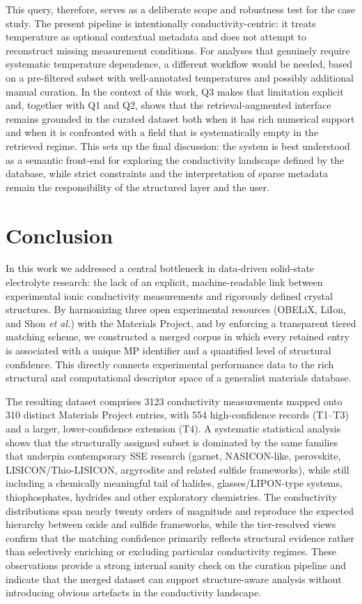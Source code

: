 \documentclass[a4paper,fleqn]{cas-sc}
\begin{document}
This query, therefore, serves as a deliberate scope and robustness test for the case study. The present pipeline is intentionally conductivity-centric: it treats temperature as optional contextual metadata and does not attempt to reconstruct missing measurement conditions. For analyses that genuinely require systematic temperature dependence, a different workflow would be needed, based on a pre-filtered subset with well-annotated temperatures and possibly additional manual curation. In the context of this work, Q3 makes that limitation explicit and, together with Q1 and Q2, shows that the retrieval-augmented interface remains grounded in the curated dataset both when it has rich numerical support and when it is confronted with a field that is systematically empty in the retrieved regime. This sets up the final discussion: the system is best understood as a semantic front-end for exploring the conductivity landscape defined by the database, while strict constraints and the interpretation of sparse metadata remain the responsibility of the structured layer and the user.



\section{Conclusion}

In this work we addressed a central bottleneck in data-driven solid-state electrolyte research: the lack of an explicit, machine-readable link between experimental ionic conductivity measurements and rigorously defined crystal structures. By harmonizing three open experimental resources (OBELiX, LiIon, and Shon \textit{et al.}) with the Materials Project, and by enforcing a transparent tiered matching scheme, we constructed a merged corpus in which every retained entry is associated with a unique MP identifier and a quantified level of structural confidence. This directly connects experimental performance data to the rich structural and computational descriptor space of a generalist materials database.

The resulting dataset comprises 3123 conductivity measurements mapped onto 310 distinct Materials Project entries, with 554 high-confidence records (T1–T3) and a larger, lower-confidence extension (T4). A systematic statistical analysis shows that the structurally assigned subset is dominated by the same families that underpin contemporary SSE research (garnet, NASICON-like, perovskite, LISICON/Thio-LISICON, argyrodite and related sulfide frameworks), while still including a chemically meaningful tail of halides, glasses/LIPON-type systems, thiophosphates, hydrides and other exploratory chemistries. The conductivity distributions span nearly twenty orders of magnitude and reproduce the expected hierarchy between oxide and sulfide frameworks, while the tier-resolved views confirm that the matching confidence primarily reflects structural evidence rather than selectively enriching or excluding particular conductivity regimes. These observations provide a strong internal sanity check on the curation pipeline and indicate that the merged dataset can support structure-aware analysis without introducing obvious artefacts in the conductivity landscape.
\end{document}
